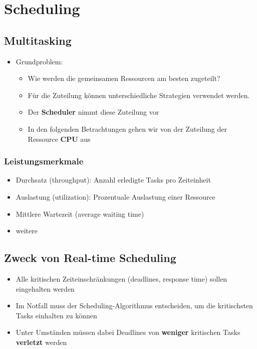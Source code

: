 \section{Scheduling}

\subsection{Multitasking}
\begin{itemize}
  \item Grundproblem:
        \begin{itemize}
          \item Wie werden die gemeinsamen Ressourcen am besten zugeteilt?
          \item Für die Zuteilung können unterschiedliche Strategien verwendet werden.
          \item Der \textbf{Scheduler} nimmt diese Zuteilung vor
          \item In den folgenden Betrachtungen gehen wir von der Zuteilung der Ressource \textbf{CPU} aus
        \end{itemize}
\end{itemize}

\subsubsection{Leistungsmerkmale}
\begin{itemize}
  \item Durchsatz (throughput): Anzahl erledigte Tasks pro Zeiteinheit
  \item Auslastung (utilization): Prozentuale Auslastung einer Ressource
  \item Mittlere Wartezeit (average waiting time)
  \item weitere
\end{itemize}

\subsection{Zweck von Real-time Scheduling}
\begin{itemize}
  \item Alle kritischen Zeiteinschränkungen (deadlines, response time) sollen eingehalten werden
  \item Im Notfall muss der Scheduling-Algorithmus entscheiden, um die kritischsten Tasks einhalten zu können
  \item Unter Umständen müssen dabei Deadlines von \textbf{weniger} kritischen Tasks \textbf{verletzt} werden
\end{itemize}

